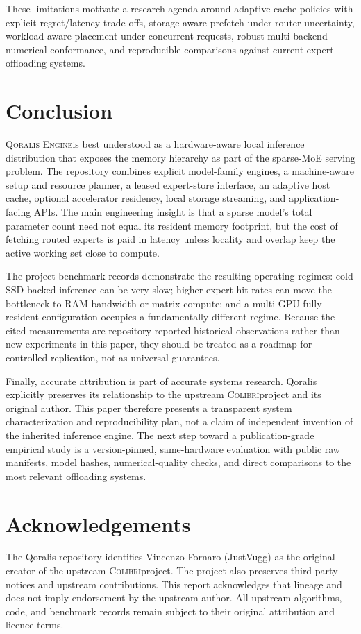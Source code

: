 \documentclass[10pt,twocolumn]{article}
\newcommand{\qoralis}{\textsc{Qoralis Engine}}
\newcommand{\colibri}{\textsc{Colibri}}
\begin{document}
These limitations motivate a research agenda around adaptive cache policies with explicit regret/latency trade-offs, storage-aware prefetch under router uncertainty, workload-aware placement under concurrent requests, robust multi-backend numerical conformance, and reproducible comparisons against current expert-offloading systems.

\section{Conclusion}
\qoralis is best understood as a hardware-aware local inference distribution that exposes the memory hierarchy as part of the sparse-MoE serving problem. The repository combines explicit model-family engines, a machine-aware setup and resource planner, a leased expert-store interface, an adaptive host cache, optional accelerator residency, local storage streaming, and application-facing APIs. The main engineering insight is that a sparse model's total parameter count need not equal its resident memory footprint, but the cost of fetching routed experts is paid in latency unless locality and overlap keep the active working set close to compute.

The project benchmark records demonstrate the resulting operating regimes: cold SSD-backed inference can be very slow; higher expert hit rates can move the bottleneck to RAM bandwidth or matrix compute; and a multi-GPU fully resident configuration occupies a fundamentally different regime. Because the cited measurements are repository-reported historical observations rather than new experiments in this paper, they should be treated as a roadmap for controlled replication, not as universal guarantees.

Finally, accurate attribution is part of accurate systems research. Qoralis explicitly preserves its relationship to the upstream \colibri project and its original author. This paper therefore presents a transparent system characterization and reproducibility plan, not a claim of independent invention of the inherited inference engine. The next step toward a publication-grade empirical study is a version-pinned, same-hardware evaluation with public raw manifests, model hashes, numerical-quality checks, and direct comparisons to the most relevant offloading systems.

\section*{Acknowledgements}
The Qoralis repository identifies Vincenzo Fornaro (JustVugg) as the original creator of the upstream \colibri project. The project also preserves third-party notices and upstream contributions. This report acknowledges that lineage and does not imply endorsement by the upstream author. All upstream algorithms, code, and benchmark records remain subject to their original attribution and licence terms.

\balance
\printbibliography[title={References}]
\end{document}
